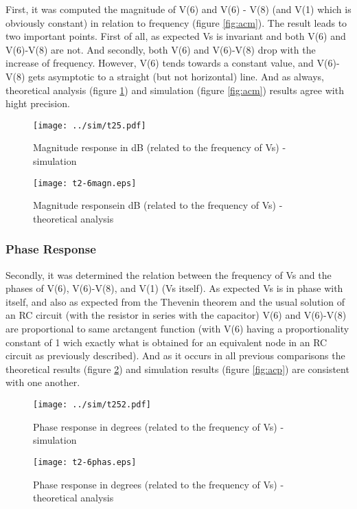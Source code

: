 First, it was computed the magnitude of V(6) and V(6) - V(8) (and V(1) which is obviously constant) in relation to frequency (figure \ref{fig:acm}). The result leads to two important points. First of all, as expected Vs is invariant and both V(6) and V(6)-V(8) are not. And secondly, both V(6) and V(6)-V(8) drop with the increase of frequency. However, V(6) tends towards a constant value, and V(6)-V(8) gets asymptotic to a straight (but not horizontal) line. And as always, theoretical analysis (figure \ref{fig:compmagn}) and simulation (figure \ref{fig:acm}) results agree with hight precision.



\begin{figure}[h] \centering
  \begin{minipage}{.5\textwidth}
    \texttt{[image: ../sim/t25.pdf]}
    \caption{Magnitude response in dB (related to the frequency of Vs) - simulation}
    \label{fig:acm}
    \end{minipage}%
  \begin{minipage}{.5\textwidth}
    \vspace{10mm}
  \centering
    \texttt{[image: t2-6magn.eps]}
    \caption{Magnitude responsein dB (related to the frequency of Vs) - theoretical analysis }
    \label{fig:compmagn}
      \end{minipage}%
\end{figure}


\subsubsection{Phase Response}

Secondly, it was determined the relation between the frequency of Vs and the phases of V(6), V(6)-V(8), and V(1) (Vs itself). As expected Vs is in phase with itself, and also as expected from the Thevenin theorem and the usual solution of an RC circuit (with the resistor in series with the capacitor) V(6) and V(6)-V(8) are proportional to same arctangent function (with V(6) having a proportionality constant of 1 wich exactly what is obtained for an equivalent node in an RC circuit as previously described). And as it occurs in all previous comparisons the theoretical results (figure \ref{fig:comphas}) and simulation results (figure \ref{fig:acp}) are consistent with one another.

\begin{figure}[h] \centering
  \begin{minipage}{.5\textwidth}
    \texttt{[image: ../sim/t252.pdf]}
    \caption{Phase response in degrees (related to the frequency of Vs) - simulation}
    \label{fig:acp}
    \end{minipage}%
  \begin{minipage}{.5\textwidth}
    \vspace{10mm}
  \centering
    \texttt{[image: t2-6phas.eps]}
    \caption{Phase response in degrees (related to the frequency of Vs) - theoretical analysis}
    \label{fig:comphas}
      \end{minipage}%
\end{figure}

